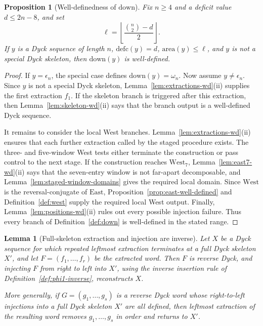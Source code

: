 \documentclass[11pt]{article}
\theoremstyle{plain}
\newtheorem{lemma}[theorem]{Lemma}
\newtheorem{proposition}[theorem]{Proposition}
\theoremstyle{definition}
\theoremstyle{remark}
\newcommand{\area}{\mathrm{area}}
\newcommand{\defc}{\mathrm{defc}}
\begin{document}
\begin{proposition}[Well-definedness of \(\mathrm{down}\)]
\label{prop:down-wd}
Fix \(n\ge 4\) and a deficit value \(d\le 2n-8\), and set
\[
  \ell=\left\lfloor\frac{\binom n2-d}{2}\right\rfloor.
\]
If \(y\) is a Dyck sequence of length \(n\), \(\defc(y)=d\),
\(\area(y)\le \ell\), and \(y\) is not a special Dyck skeleton, then
\(\mathrm{down}(y)\) is well-defined.
\end{proposition}

\begin{proof}
If \(y=\epsilon_n\), the special case defines \(\mathrm{down}(y)=\omega_n\).
Now assume \(y\ne\epsilon_n\).  Since \(y\) is not a special Dyck skeleton,
Lemma~\ref{lem:extractions-wd}\textup{(ii)} supplies the first extraction
\(f_1\).  If the skeleton branch is triggered after this extraction, then
Lemma~\ref{lem:skeleton-wd}\textup{(ii)} says that the branch output is a
well-defined Dyck sequence.

It remains to consider the local West branches.  Lemma~\ref{lem:extractions-wd}\textup{(ii)}
ensures that each further extraction called by the staged procedure exists.
The three- and five-window West tests either terminate the construction or pass
control to the next stage.  If the construction reaches \(\mathrm{West}_7\),
Lemma~\ref{lem:east7-wd}\textup{(ii)} says that the seven-entry window is not
far-apart decomposable, and Lemma~\ref{lem:staged-window-domains} gives the
required local domain.  Since \(\mathrm{West}\) is the reversal-conjugate of
\(\mathrm{East}\), Proposition~\ref{prop:east-well-defined} and
Definition~\ref{def:west} supply the required local West output.  Finally,
Lemma~\ref{lem:positions-wd}\textup{(ii)} rules out every possible injection
failure.  Thus every branch of Definition~\ref{def:down} is well-defined in
the stated range.
\end{proof}

\begin{lemma}[Full-skeleton extraction and injection are inverse]
\label{lem:full-skeleton-extraction-injection-inverse}
Let \(X\) be a Dyck sequence for which repeated leftmost extraction terminates
at a full Dyck skeleton \(X'\), and let \(F=(f_1,\ldots,f_r)\) be the extracted
word.  Then \(F\) is reverse Dyck, and injecting \(F\) from right to left into
\(X'\), using the inverse insertion rule of Definition~\ref{def:phi1-inverse},
reconstructs \(X\).

More generally, if \(G=(g_1,\ldots,g_s)\) is a reverse Dyck word whose
right-to-left injections into a full Dyck skeleton \(X'\) are all defined, then
leftmost extraction of the resulting word removes \(g_1,\ldots,g_s\) in order
and returns to \(X'\).
\end{lemma}
\end{document}
